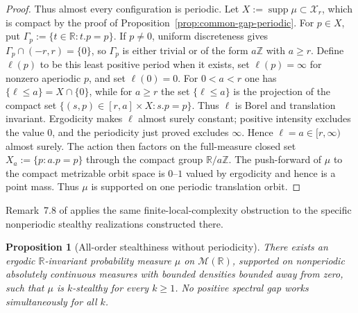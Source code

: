 \documentclass[11pt,reqno,a4paper]{amsart}
\numberwithin{equation}{section}
\theoremstyle{compact}
\newtheorem{proposition}[proposition]{Proposition}
\theoremstyle{definition}
\theoremstyle{definition}
\newcommand{\cM}{\mathcal M}
\begin{document}
\begin{proof}
Thus almost every configuration is periodic.  Let
$X:=\operatorname{supp}\mu\subset\mathscr X_r$, which is compact by the
proof of Proposition~\ref{prop:common-gap-periodic}.  For $p\in X$, put
$\Gamma_p:=\{t\in\mathbb R:t.p=p\}$.  If $p\neq0$, uniform discreteness gives
$\Gamma_p\cap(-r,r)=\{0\}$, so $\Gamma_p$ is either trivial or of the form
$a\mathbb Z$ with $a\ge r$.  Define $\ell(p)$ to be this least positive period
when it exists, set $\ell(p)=\infty$ for nonzero aperiodic $p$, and set
$\ell(0)=0$.  For $0<a<r$ one has $\{\ell\le a\}=X\cap\{0\}$, while for
$a\ge r$ the set $\{\ell\le a\}$ is the projection of the compact set
$\{(s,p)\in[r,a]\times X:s.p=p\}$.  Thus $\ell$ is Borel and translation
invariant.  Ergodicity makes $\ell$ almost surely constant; positive intensity
excludes the value $0$, and the periodicity just proved excludes $\infty$.
Hence $\ell=a\in[r,\infty)$ almost surely.  The action then factors on the
full-measure closed set $X_a:=\{p:a.p=p\}$ through the compact group
$\mathbb R/a\mathbb Z$.  The push-forward of $\mu$ to the compact metrizable
orbit space is $0$--$1$ valued by ergodicity and hence is a point mass.  Thus
$\mu$ is supported on one periodic translation orbit.
\end{proof}

Remark~7.8 of \cite{Bjo26a} applies the same finite-local-complexity
obstruction to the specific nonperiodic stealthy realizations constructed
there.


\begin{proposition}[All-order stealthiness without periodicity]
\label{prop:all-order-diffuse-stealthy}
There exists an ergodic $\mathbb R$-invariant probability measure
$\mu$ on $\cM(\mathbb R)$, supported on nonperiodic absolutely continuous
measures with bounded densities bounded away from zero, such that $\mu$ is
$k$-stealthy for every $k\geq1$.  No positive spectral gap works simultaneously
for all $k$.
\end{proposition}
\end{document}
